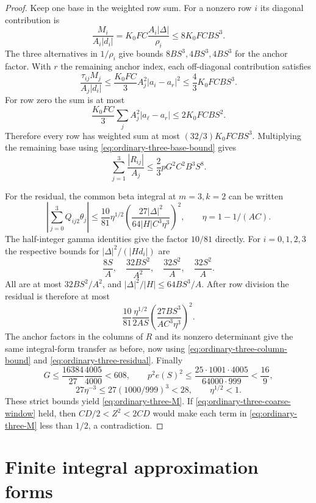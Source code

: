 \documentclass[12pt]{article}
\numberwithin{equation}{section}
\begin{document}
\begin{proof}
Keep one base in the weighted row sum.  For a nonzero row $i$ its
diagonal contribution is
\[
 \frac{M_i}{A_i|d_i|}
 =K_0FC\frac{A_i|\Delta|}{\rho_i}\le8K_0FCBS^3.
\]
The three alternatives in $1/\rho_i$ give bounds $8BS^3,4BS^3,4BS^3$
for the anchor factor.  With $r$ the remaining anchor index, each
off-diagonal contribution satisfies
\[
 \frac{\tau_{ij}M_j}{A_j|d_i|}
 \le\frac{K_0FC}{3}A_j^2|a_i-a_r|^2
 \le\frac43K_0FCBS^3.
\]
For row zero the sum is at most
\[
 \frac{K_0FC}{3}\sum_j A_j^2|a_\ell-a_r|
 \le2K_0FCBS^2.
\]
Therefore every row has weighted sum at most
$(32/3)K_0FCBS^3$.  Multiplying the remaining base using
\eqref{eq:ordinary-three-base-bound} gives
\begin{equation}\label{eq:ordinary-three-column-bound}
 \sum_{j=1}^3\frac{|R_{ij}|}{A_j}
 \le\frac23pG^2C^2B^3S^8.
\end{equation}

For the residual, the common beta integral at $m=3,k=2$ can be written
\[
 \left|\sum_{j=0}^3Q_{ij2}\theta_j\right|
 \le\frac{10}{81}\eta^{1/2}
       \left(\frac{27|\Delta|^2}{64|H|C^3\eta^3}\right)^2,
 \qquad\eta=1-1/(AC).
\]
The half-integer gamma identities give the factor $10/81$ directly.
For $i=0,1,2,3$ the respective bounds for
$|\Delta|^2/(|H d_i|)$ are
\[
 \frac{8S}{A},\quad\frac{32BS^2}{A^2},\quad
 \frac{32S^2}{A},\quad\frac{32S^2}{A}.
\]
All are at most $32BS^2/A^2$, and
$|\Delta|^2/|H|\le64BS^3/A$.  After row division the residual is
therefore at most
\begin{equation}\label{eq:ordinary-three-residual}
 \frac{10}{81}\frac{\eta^{1/2}}{2AS}
       \left(\frac{27BS^3}{AC^3\eta^3}\right)^2.
\end{equation}
The anchor factors in the columns of $R$ and its nonzero determinant
give the same integral-form transfer as before, now using
\eqref{eq:ordinary-three-column-bound} and
\eqref{eq:ordinary-three-residual}.  Finally
\[
 G\le\frac{16384}{27}\frac{4005}{4000}<608,
 \qquad
 p^2e(S)^2\le
 \frac{25\cdot1001\cdot4005}{64000\cdot999}<\frac{16}{9},
\]
\[
 27\eta^{-3}\le27(1000/999)^3<28,
 \qquad\eta^{1/2}<1.
\]
These strict bounds yield \eqref{eq:ordinary-three-M}.
If \eqref{eq:ordinary-three-coarse-window} held, then
$CD/2<Z^2<2CD$ would make each term in
\eqref{eq:ordinary-three-M} less than $1/2$, a contradiction.
\end{proof}

\section{Finite integral approximation forms}\label{sec:finiteforms}
\end{document}
